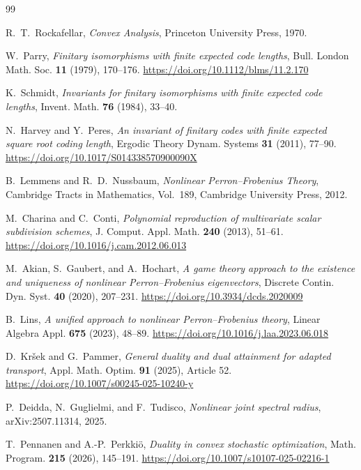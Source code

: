 \documentclass[11pt,a4paper]{article}
\theoremstyle{definition}
\theoremstyle{remark}
\begin{document}
\begin{thebibliography}{99}

R.~T.~Rockafellar,
\emph{Convex Analysis},
Princeton University Press, 1970.

W.~Parry,
\emph{Finitary isomorphisms with finite expected code lengths},
Bull. London Math. Soc. \textbf{11} (1979), 170--176.
\url{https://doi.org/10.1112/blms/11.2.170}

K.~Schmidt,
\emph{Invariants for finitary isomorphisms with finite expected code lengths},
Invent. Math. \textbf{76} (1984), 33--40.

N.~Harvey and Y.~Peres,
\emph{An invariant of finitary codes with finite expected square root coding length},
Ergodic Theory Dynam. Systems \textbf{31} (2011), 77--90.
\url{https://doi.org/10.1017/S014338570900090X}

B.~Lemmens and R.~D.~Nussbaum,
\emph{Nonlinear Perron--Frobenius Theory},
Cambridge Tracts in Mathematics, Vol.~189, Cambridge University Press, 2012.

M.~Charina and C.~Conti,
\emph{Polynomial reproduction of multivariate scalar subdivision schemes},
J. Comput. Appl. Math. \textbf{240} (2013), 51--61.
\url{https://doi.org/10.1016/j.cam.2012.06.013}

M.~Akian, S.~Gaubert, and A.~Hochart,
\emph{A game theory approach to the existence and uniqueness of nonlinear
Perron--Frobenius eigenvectors},
Discrete Contin. Dyn. Syst. \textbf{40} (2020), 207--231.
\url{https://doi.org/10.3934/dcds.2020009}

B.~Lins,
\emph{A unified approach to nonlinear Perron--Frobenius theory},
Linear Algebra Appl. \textbf{675} (2023), 48--89.
\url{https://doi.org/10.1016/j.laa.2023.06.018}

D.~Kr\v{s}ek and G.~Pammer,
\emph{General duality and dual attainment for adapted transport},
Appl. Math. Optim. \textbf{91} (2025), Article 52.
\url{https://doi.org/10.1007/s00245-025-10240-y}

P.~Deidda, N.~Guglielmi, and F.~Tudisco,
\emph{Nonlinear joint spectral radius},
arXiv:2507.11314, 2025.

T.~Pennanen and A.-P.~Perkki\"o,
\emph{Duality in convex stochastic optimization},
Math. Program. \textbf{215} (2026), 145--191.
\url{https://doi.org/10.1007/s10107-025-02216-1}


\end{thebibliography}
\end{document}
